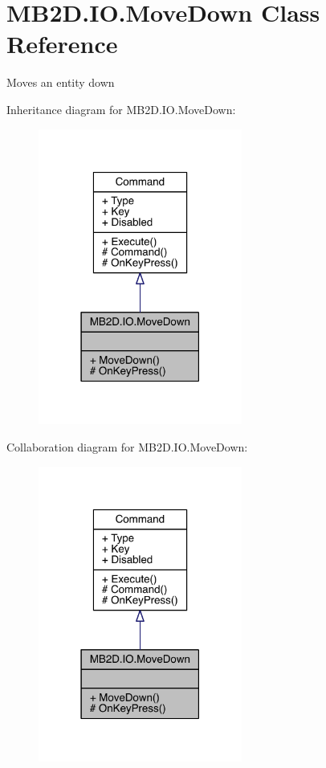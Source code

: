 \hypertarget{class_m_b2_d_1_1_i_o_1_1_move_down}{}\section{M\+B2\+D.\+I\+O.\+Move\+Down Class Reference}
\label{class_m_b2_d_1_1_i_o_1_1_move_down}


Moves an entity down  




Inheritance diagram for M\+B2\+D.\+I\+O.\+Move\+Down\+:\nopagebreak
\begin{figure}[H]
\begin{center}
\leavevmode
\includegraphics[width=190pt]{class_m_b2_d_1_1_i_o_1_1_move_down__inherit__graph}
\end{center}
\end{figure}


Collaboration diagram for M\+B2\+D.\+I\+O.\+Move\+Down\+:\nopagebreak
\begin{figure}[H]
\begin{center}
\leavevmode
\includegraphics[width=190pt]{class_m_b2_d_1_1_i_o_1_1_move_down__coll__graph}
\end{center}
\end{figure}
